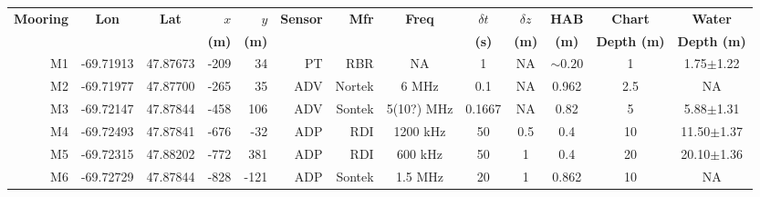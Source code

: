 \documentclass[letterpaper,10pt,landscape]{article}
\begin{document}
\thispagestyle{empty}



\begin{table}
  \label{t:mooring_table}
  \centering
  \begin{tabular}{|r|c|c|r|r|r|r|c|c|c|c|c|c|} \hline
    {\bf Mooring}       & {\bf Lon}                  & {\bf Lat}                 & $x$                    & $y$                   & {\bf Sensor} &{\bf Mfr}   & {\bf Freq}&$\delta t$ &$\delta z$& {\bf HAB}  & {\bf Chart}        & {\bf Water}       \\
    ~                   &                            &                           & {\bf (m)}              & {\bf (m)}             &              &            &           & {\bf (s)} & {\bf (m)}& {\bf (m)}  & {\bf Depth (m)}    & {\bf Depth (m)}   \\\hline \hline
    M1                  & -69.71913                  & 47.87673                  & -209                   & 34                    & PT           & RBR        & NA        & 1         & NA       & $\sim0.20$ & 1                  &  1.75$\pm$1.22    \\\hline
    M2                  & -69.71977                  & 47.87700                  & -265                   & 35                    & ADV          & Nortek     & 6 MHz     & 0.1       & NA       & 0.962      & 2.5                &  NA               \\\hline %
    M3                  & -69.72147                  & 47.87844                  & -458                   & 106                   & ADV          & Sontek     & 5(10?) MHz& 0.1667    & NA       & 0.82       & 5                  &  5.88$\pm$1.31    \\\hline
    M4                  & -69.72493                  & 47.87841                  & -676                   & -32                   & ADP          & RDI        & 1200 kHz  & 50        & 0.5      & 0.4        & 10                 &  11.50$\pm$1.37   \\\hline
    M5                  & -69.72315                  & 47.88202                  & -772                   & 381                   & ADP          & RDI        & 600 kHz   & 50        & 1        & 0.4        & 20                 &  20.10$\pm$1.36   \\\hline
    \multirow{4}{*}{M6} & \multirow{4}{*}{-69.72729} & \multirow{4}{*}{47.87844} & \multirow{4}{*}{-828}  & \multirow{4}{*}{-121} & ADP          & Sontek     & 1.5 MHz   & 20        & 1        & 0.862      & \multirow{4}{*}{10}&  NA               \\ 

\end{tabular}
\end{table}
\end{document}
